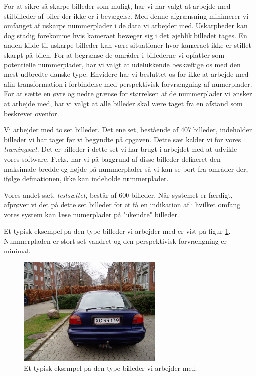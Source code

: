 For at sikre så skarpe billeder som muligt, har vi har valgt at arbejde med stilbilleder af biler der ikke er i bevægelse. Med denne afgrænsning minimerer vi omfanget af uskarpe nummerplader i de data vi arbejder med. Uskarpheder kan dog stadig forekomme hvis kameraet bevæger sig i det øjeblik billedet tages. En anden kilde til uskarpe billeder kan være situationer hvor kameraet ikke er stillet skarpt på bilen. For at begrænse de områder i billederne vi opfatter som potentielle nummerplader, har vi valgt at udelukkende beskæftige os med den mest udbredte danske type. Envidere har vi besluttet os for ikke at arbejde med afin transformation i forbindelse med perspektivisk forvrængning af numerplader. For at sætte en øvre og nedre grænse for størrelsen af de nummerplader vi ønsker at arbejde med, har vi valgt at alle billeder skal være taget fra en afstand som beskrevet ovenfor. 

Vi arbejder med to set billeder. Det ene set, bestående af 407 billeder, indeholder billeder vi har taget før vi begyndte på opgaven. Dette sæt kalder vi for vores \textit{træningsæt}. Det er billeder i dette set vi har brugt i arbejdet med at udvikle vores software. F.eks. har vi på baggrund af disse billeder defineret den maksimale bredde og højde på nummerplader så vi kan se bort fra områder der, ifølge definationen, ikke kan indeholde nummerplader.

Vores andet sæt, \textit{testsættet}, består af 600  billeder. Når systemet er færdigt, afprøver vi det på dette set billeder for at få en indikation af i hvilket omfang vores system kan læse numerplader på "ukendte" billeder.

Et typisk eksempel på den type billeder vi arbejder med er vist på figur \ref{fig:typisk_billede}. Nummerpladen er stort set vandret og den perspektivisk forvrængning er minimal.

\begin{figure}[htp]
\centering
\includegraphics[width=7cm]{illu/B_XC33139.JPG} 
\caption{Et typisk eksempel på den type billeder vi arbejder med.}
\label{fig:typisk_billede}
\end{figure}

